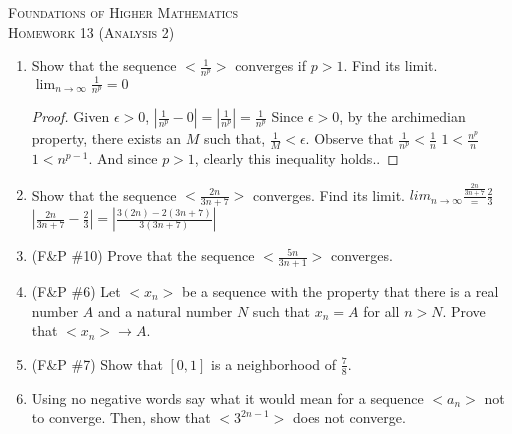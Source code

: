 \documentclass{article}
\theoremstyle{problem}
\theoremstyle{plain}
\theoremstyle{remark}
\begin{document}
\begin{center}
  \textsc{\Large Foundations of Higher Mathematics}\\[.3cm]
  \textsc{\Large Homework 13 (Analysis 2)}
\end{center}

\begin{enumerate}
\item Show that the sequence $<\frac{1}{n^p}>$ converges if $p > 1$. Find its limit.
  $\lim_{n \to \infty} \frac{1}{n^p} = 0$\\
  \begin{proof}
    Given $\epsilon > 0$,
    $|\frac{1}{n^p} - 0| = |\frac{1}{n^p}| = \frac{1}{n^p}$
    Since $\epsilon > 0$, by the archimedian property, there exists an $M$ such that,
    $\frac{1}{M} < \epsilon$.
    Observe that
    $\frac{1}{n^p} < \frac{1}{n}$
    $1 < \frac{n^p}{n}$
    $1 < n^{p-1}$.
    And since $p > 1$, clearly this inequality holds..     
  \end{proof}

\item Show that the sequence $<\frac{2n}{3n+7}>$ converges. Find its limit.
  $lim_{n \to \infty} \frac{\frac{2n}{3n+7}} = \frac{2}{3}$\\  
  $|\frac{2n}{3n+7} - \frac{2}{3}| = |\frac{3(2n) - 2(3n + 7)}{3(3n + 7)}|$

\item (F\&P \#10) Prove that the sequence $<\frac{5n}{3n+1}>$ converges. 

\item (F\&P \#6) Let $<x_n>$ be a sequence with the property that there is a real number $A$ and a natural number $N$ such that $x_n = A$ for all $n > N$. Prove that $<x_n> \to A$.

\item (F\&P \#7) Show that $[0,1]$ is a neighborhood of $\frac{7}{8}$.

\item Using no negative words say what it would mean for a sequence $<a_n>$ not to converge. Then, show that $<3^{2n-1}>$ does not converge.

  
\end{enumerate}
\end{document}
